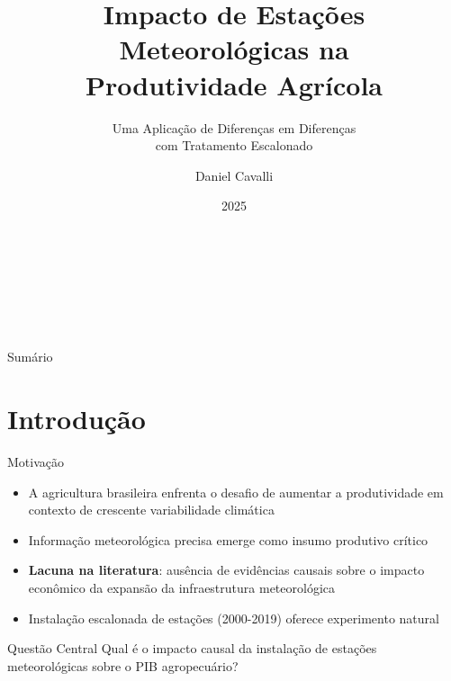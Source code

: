 \documentclass[10pt,aspectratio=169]{beamer}
\title[Estações Meteorológicas e Produtividade]{Impacto de Estações Meteorológicas na\\Produtividade Agrícola}
\subtitle{Uma Aplicação de Diferenças em Diferenças\\com Tratamento Escalonado}
\author[Daniel Cavalli]{Daniel Cavalli}
\institute[IE-UFRJ]{
  Instituto de Economia -- UFRJ\\[0.3cm]
  \small Orientador: Prof. Romero Rocha
}
\date{2025}
\begin{document}
\begin{frame}[plain]
\vspace{1cm}
{\color{white}\Large\bfseries\inserttitle}\\[0.5cm]
{\color{white}\large\insertsubtitle}\\[1cm]
{\large\insertauthor}\\[0.3cm]
{\small\insertinstitute}\\[0.5cm]
{\small\insertdate}
\end{frame}

\begin{frame}{Sumário}
\tableofcontents
\end{frame}

\section{Introdução}

\begin{frame}{Motivação}
\begin{itemize}
    \item A agricultura brasileira enfrenta o desafio de aumentar a produtividade em contexto de crescente variabilidade climática
    \vspace{0.3cm}
    \item Informação meteorológica precisa emerge como insumo produtivo crítico
    \vspace{0.3cm}
    \item \textbf{Lacuna na literatura}: ausência de evidências causais sobre o impacto econômico da expansão da infraestrutura meteorológica
    \vspace{0.3cm}
    \item Instalação escalonada de estações (2000-2019) oferece experimento natural
\end{itemize}

\begin{block}{Questão Central}
Qual é o impacto causal da instalação de estações meteorológicas sobre o PIB agropecuário?
\end{block}
\end{frame}
\end{document}
